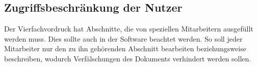 \subsection{Zugriffsbeschränkung der Nutzer}
Der Vierfachvordruck hat Abschnitte, die von speziellen Mitarbeitern ausgefüllt werden muss. Dies sollte auch in der Software beachtet werden. So soll jeder Mitarbeiter nur den zu ihn gehörenden Abschnitt bearbeiten beziehungsweise beschreiben, wodurch Verfälschungen des Dokuments verhindert werden sollen.